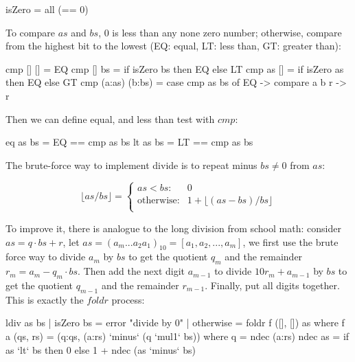 \documentclass[b5paper]{article}
\begin{document}
\begin{Answer}[ref = {ex:list-others}]
{\begin{Haskell}
isZero = all (== 0)
\end{Haskell}

To compare $as$ and $bs$, 0 is less than any none zero number; otherwise, compare from the highest bit to the lowest (EQ: equal, LT: less than, GT: greater than):

\begin{Haskell}
cmp [] [] = EQ
cmp [] bs = if isZero bs then EQ else LT
cmp as [] = if isZero as then EQ else GT
cmp (a:as) (b:bs) = case cmp as bs of EQ -> compare a b
                                      r -> r
\end{Haskell}

Then we can define equal, and less than test with $cmp$:

\begin{Haskell}
eq as bs = EQ == cmp as bs
lt as bs = LT == cmp as bs
\end{Haskell}

The brute-force way to implement divide is to repeat minus $bs \neq 0$ from $as$:

\[
\lfloor as / bs \rfloor = \begin{cases}
as < bs: & 0 \\
\text{otherwise}: & 1 + \lfloor (as - bs) / bs \rfloor \\
\end{cases}
\]

To improve it, there is analogue to the long division from school math: consider $as = q \cdot bs + r$, let $as = (a_m...a_2a_1)_{10} = [a_1, a_2, ..., a_m]$, we first use the brute force way to divide $a_m$ by $bs$ to get the quotient $q_m$ and the remainder $r_m = a_m - q_m \cdot bs$. Then add the next digit $a_{m-1}$ to divide $10 r_{m} + a_{m-1}$ by $bs$ to get the quotient $q_{m-1}$ and the remainder $r_{m-1}$. Finally, put all digits together. This is exactly the $foldr$ process:

\begin{Haskell}
ldiv as bs | isZero bs = error "divide by 0"
           | otherwise = foldr f ([], []) as where
  f a (qs, rs) = (q:qs, (a:rs) `minus` (q `mul1` bs)) where
    q =  ndec (a:rs)
  ndec as = if as `lt` bs then 0 else 1 + ndec (as `minus` bs)
\end{Haskell}
}

\end{Answer}
\end{document}
